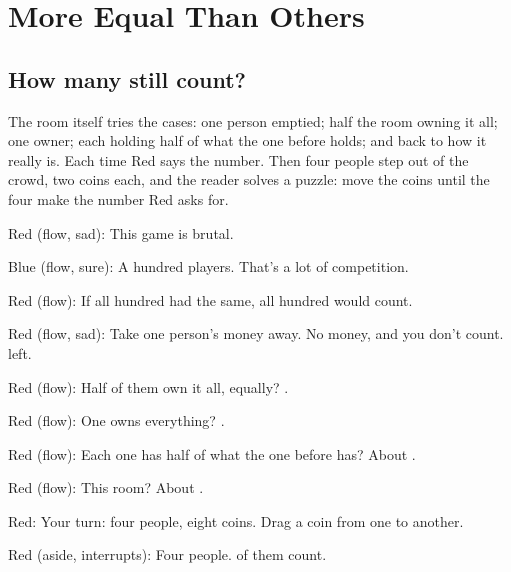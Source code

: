 \section{More Equal Than Others}\label{index:some-count-more}

\subsection{How many still count?}\label{act:count}

\label{count}

The room itself tries the cases: one person emptied; half the room owning
it all; one owner; each holding half of what the one before holds; and back
to how it really is. Each time Red says the number. Then four people step
out of the crowd, two coins each, and the reader solves a puzzle: move the
coins until the four make the number Red asks for.


Red (flow, sad): This game is brutal.

Blue (flow, sure): A hundred players.
That's a lot of competition.

Red (flow): If all hundred had the same,
all hundred would count.

Red (flow, sad): Take one person's money away.
No money, and you don't count.  left.

Red (flow): Half of them own it all, equally?
.

Red (flow): One owns everything?
.

Red (flow): Each one has half of what the one before has?
About .

Red (flow): This room?
About .


Red: Your turn: four people, eight coins.
Drag a coin from one to another.

Red (aside, interrupts): Four people.  of them count.

